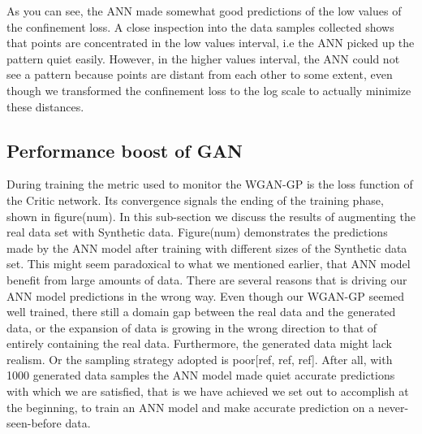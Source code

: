 \documentclass[draft, a4, 10pt, onecolumn]{IEEEtran}
\begin{document}
As you can see, the ANN made somewhat good predictions of the low values of the confinement loss. A close inspection into the data samples collected shows that points are concentrated in the low values interval, i.e the ANN picked up the pattern quiet easily. However, in the higher values interval, the ANN could not see a pattern because points are distant from each other to some extent, even though we transformed the confinement loss to the log scale to actually minimize these distances.

\subsection{Performance boost of GAN}

During training the metric used to monitor the WGAN-GP is the loss function of the Critic network. Its convergence signals the ending of the training phase, shown in figure(num).
In this sub-section we discuss the results of augmenting the real data set with Synthetic data. Figure(num) demonstrates the predictions made by the ANN model after training with different sizes of the Synthetic data set.
This might seem paradoxical to what we mentioned earlier, that ANN model benefit from large amounts of data. There are several reasons that is driving our ANN model predictions in the wrong way. Even though our WGAN-GP seemed well trained, there still a domain gap between the real data and the generated data, or the expansion of data is growing in the wrong direction to that of entirely containing the real data. Furthermore, the generated data might lack realism. Or the sampling strategy adopted is poor[ref, ref, ref]. After all, with 1000 generated data samples the ANN model made quiet accurate predictions with which we are satisfied, that is we have achieved we set out to accomplish at the beginning, to train an ANN model and make accurate prediction on a never-seen-before data.
\end{document}
